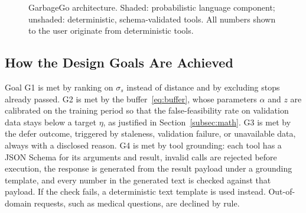 \begin{figure}[t]
\centering
{}
\caption{GarbageGo architecture. Shaded: probabilistic language component; unshaded: deterministic, schema-validated tools. All numbers shown to the user originate from deterministic tools.}
\label{fig:architecture}
\end{figure}

\subsection{How the Design Goals Are Achieved}
Goal G1 is met by ranking on $\sigma_s$ instead of distance and by excluding stops already passed. G2 is met by the buffer~\eqref{eq:buffer}, whose parameters $\alpha$ and $z$ are calibrated on the training period so that the false-feasibility rate on validation data stays below a target $\eta$, as justified in Section~\ref{subsec:math}. G3 is met by the defer outcome, triggered by staleness, validation failure, or unavailable data, always with a disclosed reason. G4 is met by tool grounding: each tool has a JSON Schema for its arguments and result, invalid calls are rejected before execution, the response is generated from the result payload under a grounding template, and every number in the generated text is checked against that payload. If the check fails, a deterministic text template is used instead. Out-of-domain requests, such as medical questions, are declined by rule.


